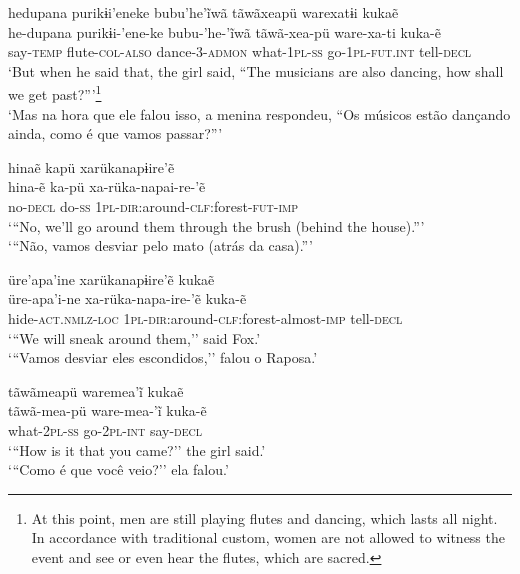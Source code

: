 \documentclass[output=paper,
modfonts,nonflat
]{langsci/langscibook}
\begin{document}
\ea   hedupana purikɨi'eneke bubu'he'ĩwã tãwãxeapü warexatɨi kukaẽ \\[.3em]
\gll  he-dupana purikɨi-'ene-ke bubu-'he-'ĩwã tãwã-xea-pü ware-xa-ti kuka-ẽ \\
say-\textsc{temp} flute-\textsc{col-also} dance-\textsc{3-admon} what-\textsc{1pl-ss} go-\textsc{1pl-fut.int} tell-\textsc{decl}\\
\glt   `But when he said that, the girl said, ``The musicians are also dancing, how shall we get past?{''}'\footnote{At this point, men are still playing flutes and dancing, which lasts all night. In accordance with traditional custom, women are not allowed to witness the event and see or even hear the flutes, which are sacred.} \\
 `Mas na hora que ele falou isso, a menina respondeu, ``Os músicos estão dançando ainda, como é que vamos passar?{''}' \\
\z

\newpage 
 
\ea   hinaẽ kapü xarükanapɨire'ẽ \\[.3em]
\gll hina-ẽ ka-pü xa-rüka-napai-re-'ẽ \\
no-\textsc{decl} do-\textsc{ss} \textsc{1pl-dir:}around-\textsc{clf:}forest-\textsc{fut-imp}\\
\glt   `{``}No, we'll go around them through the brush (behind the house).{''}' \\
 `{``}Não, vamos desviar pelo mato (atrás da casa).{''}' \\
\z

\ea   üre'apa'ine xarükanapɨire'ẽ kukaẽ \\[.3em]
\gll üre-apa'i-ne xa-rüka-napa-ire-'ẽ kuka-ẽ\\
hide-\textsc{act.nmlz-loc} \textsc{1pl-dir:}around-\textsc{clf:}forest-almost\textsc{-imp} tell-\textsc{decl}\\
\glt  `{``}We will sneak around them,'' said Fox.' \\
`{``}Vamos desviar eles escondidos,'' falou o Raposa.'\\
\z

\ea  tãwãmeapü waremea'ĩ kukaẽ \\[.3em]
\gll tãwã-mea-pü ware-mea-'ĩ kuka-ẽ\\
what-\textsc{2pl-ss} go-\textsc{2pl-int} say-\textsc{decl}\\
\glt `{``}How is it that you came?'' the girl said.' \\
`{``}Como é que você veio?'' ela falou.'\\
\z
\end{document}
